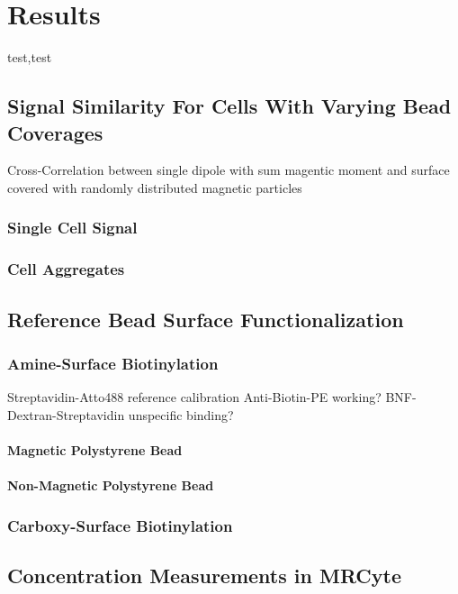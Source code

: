 \chapter{Results}
test,test

\section{Signal Similarity For Cells With Varying Bead Coverages}
Cross-Correlation between single dipole with sum magentic moment and surface covered with randomly distributed magnetic particles
\subsection{Single Cell Signal}

\subsection{Cell Aggregates}

\section{Reference Bead Surface Functionalization}

\subsection{Amine-Surface Biotinylation}
Streptavidin-Atto488 reference calibration
Anti-Biotin-PE working?
BNF-Dextran-Streptavidin unspecific binding?


\subsubsection{Magnetic Polystyrene Bead}

\subsubsection{Non-Magnetic Polystyrene Bead}

\subsection{Carboxy-Surface Biotinylation}

\section{Concentration Measurements in MRCyte}

